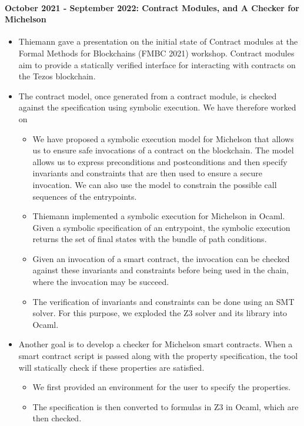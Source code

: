 \documentclass[a4paper,11pt]{article}
\begin{document}
\paragraph{October 2021 - September 2022: Contract Modules, and A Checker for Michelson}
\begin{itemize}
\item Thiemann gave a presentation on the initial state of Contract modules at the Formal Methods for Blockchains (FMBC 2021) workshop. Contract modules aim to provide a statically verified interface for interacting with contracts on the Tezos blockchain.
\item The contract model, once generated from a contract module, is checked against the specification using symbolic execution. We have therefore worked on

\begin{itemize}
\item We have proposed a symbolic execution model for Michelson that allows us to ensure safe invocations of a contract on the blockchain. The model allows us to express preconditions and postconditions and then specify invariants and constraints that are then used to ensure a secure invocation. We can also use the model to constrain the possible call sequences of the entrypoints.
\item Thiemann implemented a symbolic execution for Michelson in Ocaml. Given a symbolic specification of an entrypoint, the symbolic execution returns the set of final states with the bundle of path conditions. 
\item Given an invocation of a smart contract, the invocation can be checked against these invariants and constraints before being used in the chain, where the invocation may be succeed. 
\item The verification of invariants and constraints can be done using an SMT solver. For this purpose, we exploded the Z3 solver and its library into Ocaml.
\end{itemize}

\item Another goal is to develop a checker for Michelson smart contracts. When a smart contract script is passed along with the property specification, the tool will statically check if these properties are satisfied.
\begin{itemize}
\item We first provided an environment for the user to specify the properties. 
\item The specification is then converted to formulas in Z3 in Ocaml, which are then checked.  
\end{itemize}

\end{itemize}
\end{document}
